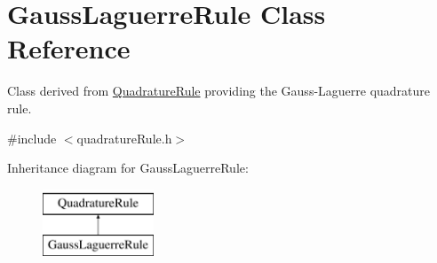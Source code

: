 \hypertarget{classGaussLaguerreRule}{\section{Gauss\-Laguerre\-Rule Class Reference}
\label{classGaussLaguerreRule}
}


Class derived from \hyperlink{classQuadratureRule}{Quadrature\-Rule} providing the Gauss-\/\-Laguerre quadrature rule.  




{\ttfamily \#include $<$quadrature\-Rule.\-h$>$}

Inheritance diagram for Gauss\-Laguerre\-Rule\-:\begin{figure}[H]
\begin{center}
\leavevmode
\includegraphics[height=2.000000cm]{classGaussLaguerreRule}
\end{center}
\end{figure}
